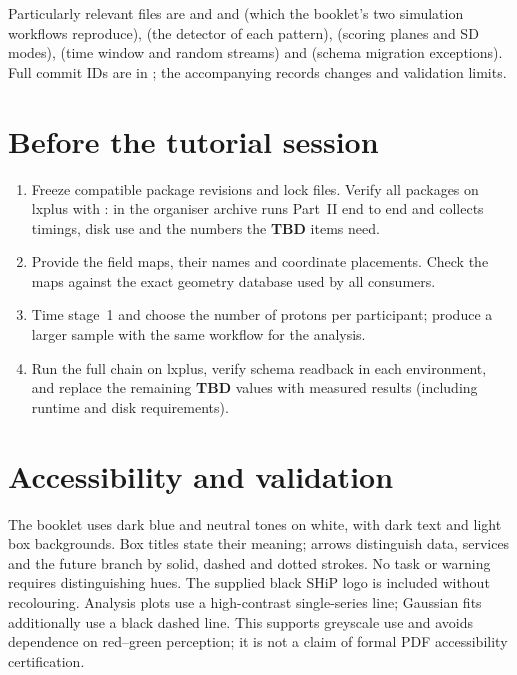 Particularly relevant files are  and
 and 
(which the booklet's two simulation workflows reproduce),
 (the detector of each pattern),
 (scoring planes and SD modes),
 (time window and random streams) and
 (schema migration exceptions). Full
commit IDs are in ; the accompanying
 records changes and validation limits.

\section{Before the tutorial session}

\begin{enumerate}
\item Freeze compatible package revisions and lock files. Verify all packages
on lxplus with :  in the organiser
archive runs Part~II end to end and collects timings, disk use and the
numbers the \textbf{TBD} items need.
\item Provide the field maps, their names and coordinate placements. Check
the maps against the exact geometry database used by all consumers.
\item Time stage~1 and choose the number of protons per participant; produce
a larger sample with the same workflow for the analysis.
\item Run the full chain on lxplus, verify schema readback in each
environment, and replace the remaining \textbf{TBD} values with measured
results (including runtime and disk requirements).
\end{enumerate}

\section{Accessibility and validation}

The booklet uses dark blue and neutral tones on white, with dark text and
light box backgrounds. Box titles state their meaning; arrows distinguish
data, services and the future branch by solid, dashed and dotted strokes.
No task or warning requires distinguishing hues. The supplied black SHiP
logo is included without recolouring. Analysis plots use a high-contrast
single-series line; Gaussian fits additionally use a black dashed line.
This supports greyscale use and avoids dependence on red--green perception;
it is not a claim of formal PDF accessibility certification.


